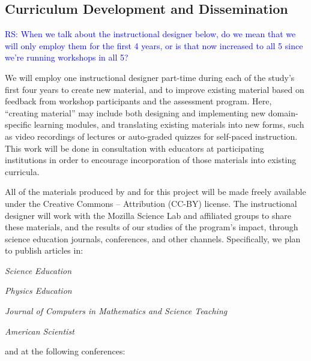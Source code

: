 \documentclass{proposalnsf}
\newlength{\up}
\newcommand{\comment}[1]{\textcolor{blue}{ #1 }}
\begin{document}
\subsection{Curriculum Development and Dissemination}

\comment{RS: When we talk about the instructional designer below, do we mean that we will only employ them for the first 4 years, or is that now increased to all 5 since we're running workshops in all 5?}

We will employ one instructional designer part-time during each of the
study's first four years to create new material, and to improve
existing material based on feedback from workshop participants and the
assessment program.  Here, ``creating material'' may include both
designing and implementing new domain-specific learning modules, and
translating existing materials into new forms, such as video
recordings of lectures or auto-graded quizzes for self-paced
instruction.  This work will be done in consultation with educators at
participating institutions in order to encourage incorporation of
those materials into existing curricula.

All of the materials produced by and for this project will be made
freely available under the Creative Commons -- Attribution (CC-BY)
license.  The instructional designer will work with the Mozilla
Science Lab and affiliated groups to share these materials, and the
results of our studies of the program's impact, through science
education journals, conferences, and other channels. Specifically, we
plan to publish articles in:

\begin{compactitem}

\item
  \emph{Science Education}

\item
  \emph{Physics Education}

\item
  \emph{Journal of Computers in Mathematics and Science Teaching}

\item
  \emph{American Scientist}

\end{compactitem}

and at the following conferences:
\end{document}
